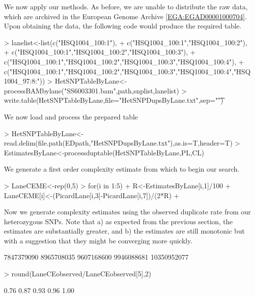 \documentclass{article}
\begin{document}
We now apply our methods. As before, we are unable to distribute the raw data, which are archived in the European Genome Archive [\href{https://www.ebi.ac.uk/ega/datasets/EGAD00001000704}{EGA:EGAD00001000704}]. Upon obtaining the data, the following code would produce the required table.

\begin{Schunk}
\begin{Sinput}
> lanelist<-list(c("HSQ1004_100:1"),
+ c("HSQ1004_100:1","HSQ1004_100:2"),
+ c("HSQ1004_100:1","HSQ1004_100:2","HSQ1004_100:3"),
+ c("HSQ1004_100:1","HSQ1004_100:2","HSQ1004_100:3","HSQ1004_100:4"),
+ c("HSQ1004_100:1","HSQ1004_100:2","HSQ1004_100:3","HSQ1004_100:4","HSQ1004_97:8:"))
> HetSNPTableByLane<-processBAMbylane("SS6003301.bam",path,snplist,lanelist)
> write.table(HetSNPTableByLane,file="HetSNPDupsByLane.txt",sep="\t")
\end{Sinput}
\end{Schunk}

We now load and process the prepared table

\begin{Schunk}
\begin{Sinput}
> HetSNPTableByLane<-read.delim(file.path(EDpath,"HetSNPDupsByLane.txt"),as.is=T,header=T)
> EstimatesByLane<-processduptable(HetSNPTableByLane,PL,CL)
\end{Sinput}
\end{Schunk}

We generate a first order complexity estimate from which to begin our search.

\begin{Schunk}
\begin{Sinput}
> LaneCEME<-rep(0,5)
> for(i in 1:5){
+   R<-EstimatesByLane[i,1]/100
+   LaneCEME[i]<-(PicardLane[i,3]-PicardLane[i,7])/(2*R)
+ }
\end{Sinput}
\end{Schunk}

Now we generate complexity estimates using the observed duplicate rate from our heterozygous SNPs. Note that a) as expected from the previous section, the estimates are substantially greater, and b) the estimates are still monotonic but with a suggestion that they might be converging more quickly.


\begin{Schunk}
\begin{Soutput}
[1]  7847379090  8965708035  9607168600  9946088681 10350952077
\end{Soutput}
\begin{Sinput}
> round(LaneCEobserved/LaneCEobserved[5],2)
\end{Sinput}
\begin{Soutput}
[1] 0.76 0.87 0.93 0.96 1.00
\end{Soutput}
\end{Schunk}
\end{document}
